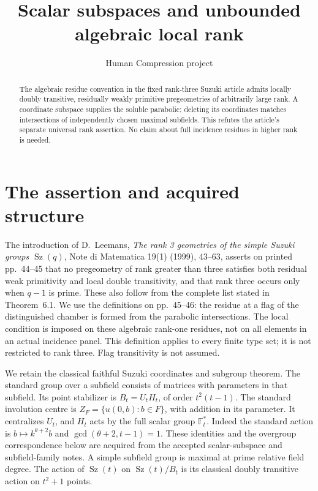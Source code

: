 \documentclass[11pt,a4paper]{article}
\title{Scalar subspaces and unbounded algebraic local rank}
\author{Human Compression project}\date{}
\newcommand{\Sz}{\operatorname{Sz}}\newcommand{\F}{\mathbb F}
\begin{document}
\maketitle
\begin{abstract}
The algebraic residue convention in the fixed rank-three Suzuki article
admits locally doubly transitive, residually weakly primitive
pregeometries of arbitrarily large rank. A coordinate subspace supplies
the soluble parabolic; deleting its coordinates matches intersections
of independently chosen maximal subfields. This refutes the article's
separate universal rank assertion. No claim about full incidence
residues in higher rank is needed.
\end{abstract}

\section{The assertion and acquired structure}
The introduction of D.~Leemans, \emph{The rank 3 geometries of the simple
Suzuki groups $\Sz(q)$}, Note di Matematica 19(1) (1999), 43--63,
asserts on printed pp.~44--45 that no pregeometry of rank greater than
three satisfies both residual weak primitivity and local double
transitivity, and that rank three occurs only when $q-1$ is prime.
These also follow from the complete list stated in Theorem~6.1.
We use the definitions on pp.~45--46: the residue at a flag of the
distinguished chamber is formed from the parabolic intersections.
The local condition is imposed on these algebraic rank-one residues,
not on all elements in an actual incidence panel. This definition
applies to every finite type set; it is not restricted to rank three.
Flag transitivity is not assumed.

We retain the classical faithful Suzuki coordinates and subgroup theorem.
The standard group over a subfield consists of matrices with parameters
in that subfield. Its point stabilizer is $B_t=U_tH_t$, of order
$t^2(t-1)$. The standard involution centre is
$Z_F=\{u(0,b):b\in F\}$, with addition in its parameter. It centralizes
$U_t$, and $H_t$ acts by the full scalar group $\F_t^*$.
Indeed the standard action is $b\mapsto k^{\theta+2}b$ and
$\gcd(\theta+2,t-1)=1$.
These identities and the overgroup correspondence below are acquired
from the accepted scalar-subspace and subfield-family notes.
A simple subfield group is maximal at prime relative field degree.
The action of $\Sz(t)$ on $\Sz(t)/B_t$ is its classical doubly
transitive action on $t^2+1$ points.
\end{document}
